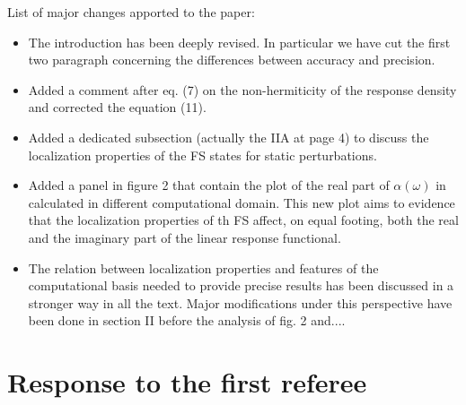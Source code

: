 \documentclass[11pt,a4paper]{article}
\begin{document}

List of major changes apported to the paper:
\begin{itemize}
 \item The introduction has been deeply revised. In particular we have cut the first two
 paragraph concerning the differences between accuracy and precision.
 \item Added a comment after eq. (7) on the non-hermiticity of the response density and corrected
 the equation (11).
 \item Added a dedicated subsection (actually the IIA at page 4)  to discuss the localization properties of the FS states for static perturbations. 
 \item Added a panel in figure 2 that contain the plot of the real part of $\alpha(\omega)$ in calculated in different computational domain. This new plot aims to evidence that the localization
 properties of th FS affect, on equal footing, both the real and the imaginary part of the linear response functional.
 \item The relation between localization properties and features of the computational basis needed to provide precise results has been discussed in a stronger way in all the text. Major modifications under this perspective have been done in section II before the analysis of fig. 2 and....
\end{itemize}


\section*{Response to the first referee}
\end{document}
